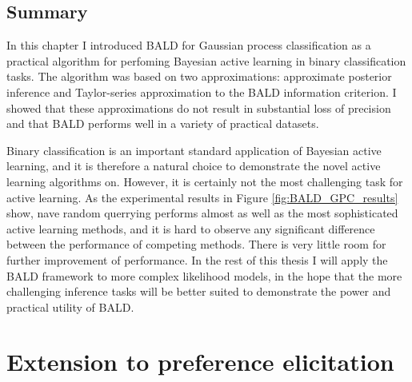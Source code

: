 \subsection{Summary}

In this chapter I introduced BALD for Gaussian process classification as a practical algorithm for perfoming Bayesian active learning in binary classification tasks. The algorithm was based on two approximations: approximate posterior inference and Taylor-series approximation to the BALD information criterion. I showed that these approximations do not result in substantial loss of precision and that BALD performs well in a variety of practical datasets.

\cbstart
Binary classification is an important standard application of Bayesian active learning, and it is therefore a natural choice to demonstrate the novel active learning algorithms on. However, it is certainly not the most challenging task for active learning. As the experimental results in Figure \ref{fig:BALD_GPC_results} show, nave random querrying performs almost as well as the most sophisticated active learning methods, and it is hard to observe any significant difference between the performance of competing methods. There is very little room for further improvement of performance. In the rest of this thesis I will apply the BALD framework to more complex likelihood models, in the hope that the more challenging inference tasks will be better suited to demonstrate the power and practical utility of BALD.
\cbend

\section{Extension to preference elicitation}

